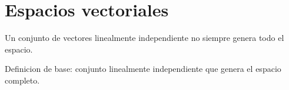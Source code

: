 \section{Espacios vectoriales}

\begin{alertbox}
Un conjunto de vectores linealmente independiente no siempre genera todo el espacio.
\end{alertbox}

\begin{examenbox}
Definicion de base: conjunto linealmente independiente que genera el espacio completo.
\end{examenbox}
